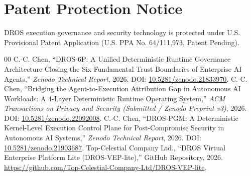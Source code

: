 \documentclass[conference]{IEEEtran}
\begin{document}
\section*{Patent Protection Notice}
DROS execution governance and security technology is protected under U.S. Provisional Patent Application (U.S. PPA No. 64/111,973, Patent Pending).


\begin{thebibliography}{00}
 C.-C. Chen, ``DROS-6P: A Unified Deterministic Runtime Governance Architecture Closing the Six Fundamental Trust Boundaries of Enterprise AI Agents,'' \textit{Zenodo Technical Report}, 2026. DOI: \href{https://doi.org/10.5281/zenodo.21833970}{10.5281/zenodo.21833970}.
 C.-C. Chen, ``Bridging the Agent-to-Execution Attribution Gap in Autonomous AI Workloads: A 4-Layer Deterministic Runtime Operating System,'' \textit{ACM Transactions on Privacy and Security (Submitted / Zenodo Preprint v3)}, 2026. DOI: \href{https://doi.org/10.5281/zenodo.22092008}{10.5281/zenodo.22092008}.
 C.-C. Chen, ``DROS-PGM: A Deterministic Kernel-Level Execution Control Plane for Post-Compromise Security in Autonomous AI Systems,'' \textit{Zenodo Technical Report}, 2026. DOI: \href{https://doi.org/10.5281/zenodo.21903687}{10.5281/zenodo.21903687}.
 Top-Celestial Company Ltd., ``DROS Virtual Enterprise Platform Lite (DROS-VEP-lite),'' GitHub Repository, 2026. \url{https://github.com/Top-Celestial-Company-Ltd/DROS-VEP-lite}.
\end{thebibliography}
\end{document}
